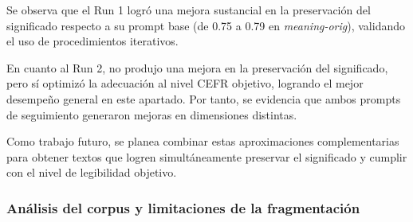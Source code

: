\begin{table}[H]
    \centering
    \caption{Resultados de los prompts de {\it TaskGen} en los datos de evaluación final.}
    \label{tab:results_metrics_tsar_all}
\end{table}

Se observa que el Run 1 logró una mejora sustancial en la preservación del significado respecto a su prompt base (de 0.75 a 0.79 en \textit{meaning-orig}), validando el uso de procedimientos iterativos. 

En cuanto al Run 2, no produjo una mejora en la preservación del significado, pero sí optimizó la adecuación al nivel CEFR objetivo, logrando el mejor desempeño general en este apartado. Por tanto, se evidencia que ambos prompts de seguimiento generaron mejoras en dimensiones distintas.

Como trabajo futuro, se planea combinar estas aproximaciones complementarias para obtener textos que logren simultáneamente preservar el significado y cumplir con el nivel de legibilidad objetivo.

\subsubsection*{Análisis del corpus y limitaciones de la fragmentación}

